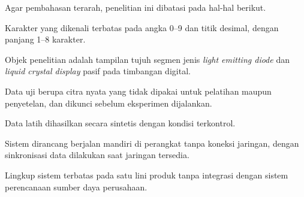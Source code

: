 Agar pembahasan terarah, penelitian ini dibatasi pada hal-hal berikut.
\begin{poin}
  \item Karakter yang dikenali terbatas pada angka 0--9 dan titik desimal,
        dengan panjang 1--8 karakter.
  \item Objek penelitian adalah tampilan tujuh segmen jenis \textit{light
        emitting diode} dan \textit{liquid crystal display} pasif pada timbangan
        digital.
  \item Data uji berupa citra nyata yang tidak dipakai untuk pelatihan maupun
        penyetelan, dan dikunci sebelum eksperimen dijalankan.
  \item Data latih dihasilkan secara sintetis dengan kondisi terkontrol.
  \item Sistem dirancang berjalan mandiri di perangkat tanpa koneksi jaringan,
        dengan sinkronisasi data dilakukan saat jaringan tersedia.
  \item Lingkup sistem terbatas pada satu lini produk tanpa integrasi dengan
        sistem perencanaan sumber daya perusahaan.
\end{poin}
